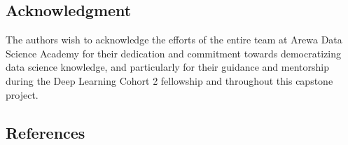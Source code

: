 \documentclass[
  journal,
]{IEEEtran}%
\begin{document}
\subsection*{Acknowledgment}\label{acknowledgment}

The authors wish to acknowledge the efforts of the entire team at Arewa
Data Science Academy for their dedication and commitment towards
democratizing data science knowledge, and particularly for their
guidance and mentorship during the Deep Learning Cohort 2 fellowship and
throughout this capstone project.

\newpage{}

\subsection*{References}\label{references}
\end{document}
